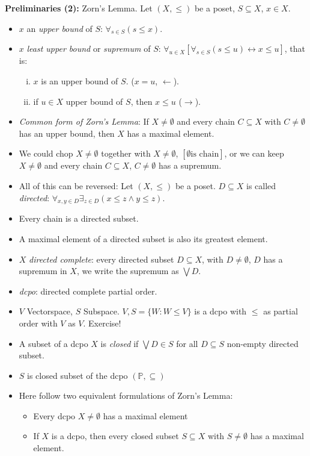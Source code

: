 \documentclass[headsepline=true,DIV=11]{scrartcl}
\theoremstyle{definition}
\begin{document}
{\bf Preliminaries (2):} Zorn's Lemma.
Let $(X,\le)$ be a poset, $S\subseteq X$, $x\in X$. 
\begin{itemize}
	\item $x$ an {\em upper bound} of $S$: $\forall_{s\in S}(s\le x)$.
	\item $x$ {\em least upper bound} or {\em supremum} of $S$: $\forall_{u\in X}[\forall_{s\in S}(s\le u) \leftrightarrow x\le u]$, that is:
	\begin{enumerate}[(i)]
		\item $x$ is an upper bound of $S$. ($x=u$, $\leftarrow$).
		\item if $u\in X$ upper bound of $S$, then $x\le u$ ($\rightarrow$).
	\end{enumerate}
	\item {\em Common form of Zorn's Lemma}: If $X\neq \emptyset$ and every chain $C\subseteq X$ with $C\neq \emptyset$ has an upper bound, then $X$ has a maximal element.
	\item We could chop $X\neq\emptyset$ together with $X\neq \emptyset$, $[\emptyset \text{is chain}]$, or we can keep $X\neq \emptyset$ and every chain $C\subseteq X$, $C\neq\emptyset$ has a supremum.
	\item All of this can be reversed: 
		Let $(X,\le)$ be a poset.
		$D\subseteq X$ is called {\em directed}: $\forall_{x,y \in D} \exists_{z\in D}(x\le z \land y\le z)$.
	\item Every chain is a directed subset.
	\item A maximal element of a directed subset is also its greatest element.
	\item $X$ {\em directed complete}: every directed subset $D\subseteq X$, with $D\neq \emptyset$, $D$ has a supremum in $X$, we write the supremum as $\bigvee D$.
	\item {\em dcpo}: directed complete partial order.
	\item $V$ Vectorspace, $S$ Subspace. $V, S =\{ W\colon W\le V\}$ is a dcpo with $\le$ as partial order with $V$ as $V$. Exercise!
	
	\item A subset of a dcpo $X$ is {\em closed} if $\bigvee D\in S$ for all $D\subseteq S$ non-empty directed subset.
	\item $S$ is closed subset of the dcpo $(\mathbb P, \subseteq)$
	\item Here follow two equivalent formulations of Zorn's Lemma:
	\begin{itemize}
		\item Every dcpo $X\neq \emptyset$ has a maximal element
		\item If $X$ is a dcpo, then every closed subset $S\subseteq X$ with $S\neq \emptyset$ has a maximal element.
	\end{itemize}
\end{itemize}
\end{document}
